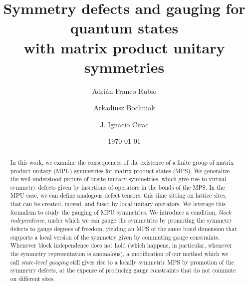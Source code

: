 \documentclass[reprint,
superscriptaddress,
amsmath,amssymb,
notitlepage,
aps,
prb,
10pt, 
tightenlines
]{revtex4-2}
\begin{document}
\title{Symmetry defects and gauging for quantum states \\with matrix product unitary symmetries}

\author{Adrián Franco Rubio}
%
%



\author{Arkadiusz Bochniak}
%
%

\author{J. Ignacio Cirac}
%
%

\date{\today}

\begin{abstract}
    In this work, we examine the consequences of the existence of a finite group of matrix product unitary (MPU) symmetries for matrix product states (MPS). We generalize the well-understood picture of onsite unitary symmetries, which give rise to virtual symmetry defects given by insertions of operators in the bonds of the MPS. In the MPU case, we can define analogous defect tensors, this time sitting on lattice sites, that can be created, moved, and fused by local unitary operators. We leverage this formalism to study the gauging of MPU symmetries. We introduce a condition, \textit{block independence}, under which we can gauge the symmetries by promoting the symmetry defects to gauge degrees of freedom, yielding an MPS of the same bond dimension that supports a local version of the symmetry given by commuting gauge constraints. Whenever block independence does not hold (which happens, in particular, whenever the symmetry representation is anomalous), a modification of our method which we call \textit{state-level gauging} still gives rise to a locally symmetric MPS by promotion of the symmetry defects, at the expense of producing gauge constraints that do not commute on different sites.
\end{abstract}
\end{document}
